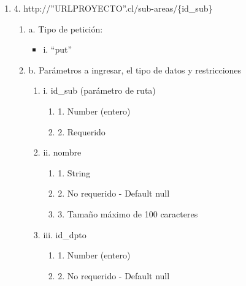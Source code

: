 \begin{enumerate}
    \item 4. http://”URLPROYECTO”.cl/sub-areas/\{id\_sub\}
    \begin{enumerate}
        \item a. Tipo de petición:
            \begin{itemize}
               \item i. “put”
            \end{itemize}
        \item b. Parámetros a ingresar, el tipo de datos y restricciones
            \begin{enumerate}
                \item i. id\_sub (parámetro de ruta)
                    \begin{enumerate}
                        \item 1. Number (entero)
                        \item 2. Requerido
                    \end{enumerate}
                \item ii. nombre
                    \begin{enumerate}
                        \item 1. String
                        \item 2. No requerido - Default null
                        \item 3. Tamaño máximo de 100 caracteres
                    \end{enumerate}
                \item iii. id\_dpto
                    \begin{enumerate}
                        \item 1. Number (entero)
                        \item 2. No requerido - Default null
                    \end{enumerate}
            \end{enumerate}
    \end{enumerate}


\end{enumerate}
